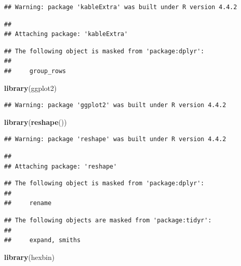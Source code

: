 \documentclass[
]{article}
\newenvironment{Shaded}{\begin{snugshade}}{\end{snugshade}}
\newcommand{\FunctionTok}[1]{\textcolor[rgb]{0.13,0.29,0.53}{\textbf{#1}}}
\newcommand{\NormalTok}[1]{#1}
\begin{document}
\begin{verbatim}
## Warning: package 'kableExtra' was built under R version 4.4.2
\end{verbatim}

\begin{verbatim}
## 
## Attaching package: 'kableExtra'
\end{verbatim}

\begin{verbatim}
## The following object is masked from 'package:dplyr':
## 
##     group_rows
\end{verbatim}

\begin{Shaded}
\begin{Highlighting}[]
\FunctionTok{library}\NormalTok{(ggplot2)}
\end{Highlighting}
\end{Shaded}

\begin{verbatim}
## Warning: package 'ggplot2' was built under R version 4.4.2
\end{verbatim}

\begin{Shaded}
\begin{Highlighting}[]
\FunctionTok{library}\NormalTok{(}\FunctionTok{reshape}\NormalTok{())}
\end{Highlighting}
\end{Shaded}

\begin{verbatim}
## Warning: package 'reshape' was built under R version 4.4.2
\end{verbatim}

\begin{verbatim}
## 
## Attaching package: 'reshape'
\end{verbatim}

\begin{verbatim}
## The following object is masked from 'package:dplyr':
## 
##     rename
\end{verbatim}

\begin{verbatim}
## The following objects are masked from 'package:tidyr':
## 
##     expand, smiths
\end{verbatim}

\begin{Shaded}
\begin{Highlighting}[]
\FunctionTok{library}\NormalTok{(hexbin)}
\end{Highlighting}
\end{Shaded}
\end{document}
